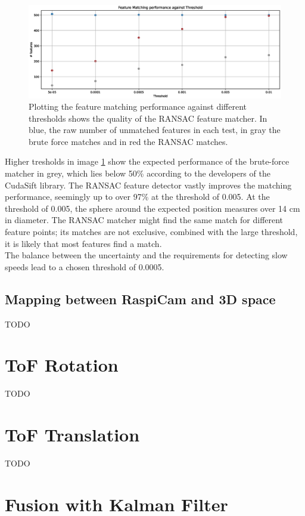 \begin{figure}[H]
    \centering
    \includegraphics[width=1.0\textwidth]{images/noise_against_threshold.eps}
    \caption{Plotting the feature matching performance against different thresholds shows the quality of the RANSAC feature matcher. In blue, the raw number of unmatched features in each test, in gray the brute force matches and in red the RANSAC matches.}
    \label{im:noise_against_thresh}
\end{figure}
Higher tresholds in image \ref{im:noise_against_thresh} show the expected performance of the brute-force matcher in grey, which lies below 50\% according to the developers of the CudaSift library.\cite{cudaSiftRepo} The RANSAC feature detector vastly improves the matching performance, seemingly up to over 97\% at the threshold of 0.005. At the threshold of 0.005, the sphere around the expected position measures over 14 cm in diameter. The RANSAC matcher might find the same match for different feature points; its matches are not exclusive, combined with the large threshold, it is likely that most features find a match.\\
The balance between the uncertainty and the requirements for detecting slow speeds lead to a chosen threshold of 0.0005.
\subsection{Mapping between RaspiCam and 3D space}
TODO
\section{ToF Rotation}
TODO
\section{ToF Translation}
TODO
\section{Fusion with Kalman Filter}
